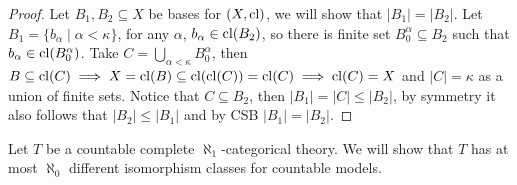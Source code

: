 \begin{proof}
	Let $B_1, B_2 \subseteq X$ be bases for $(X, \operatorname{cl})$, we will show that $|B_1| = |B_2|$.
	Let $B_1 = \{ b_{\alpha} \mid \alpha < \kappa \}$, for any $\alpha$, $b_\alpha \in \operatorname{cl}(B_2)$, so there is finite set $B_0^{\alpha} \subseteq B_2$ such that $b_{\alpha} \in \operatorname{cl}(B_0^{\alpha})$.
	Take $C = \bigcup_{\alpha < \kappa} B_0^{\alpha}$, then $B \subseteq \operatorname{cl}(C) \implies X = \operatorname{cl}(B) \subseteq \operatorname{cl}(\operatorname{cl}(C)) = \operatorname{cl}(C) \implies \operatorname{cl}(C) = X$ and $|C| = \kappa$ as a union of finite sets.
	Notice that $C \subseteq B_2$, then $|B_1| = |C| \le |B_2|$, by symmetry it also follows that $|B_2| \le |B_1|$ and by CSB $|B_1| = |B_2|$.
\end{proof}

\subquestion{}
Let $T$ be a countable complete $\aleph_1$-categorical theory.
We will show that $T$ has at most $\aleph_0$ different isomorphism classes for countable models.
